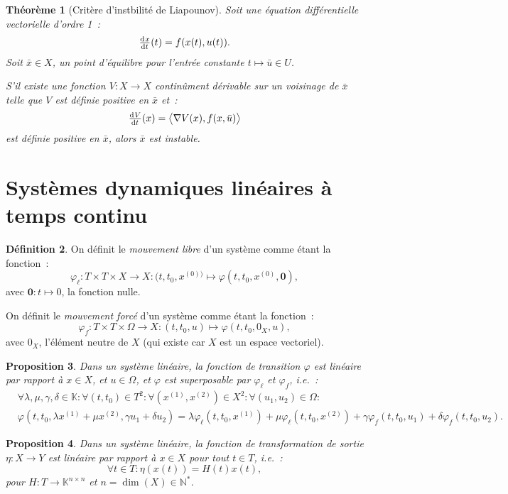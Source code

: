 \documentclass{article}
\newtheorem{thm}{Théorème}[section]
\newtheorem{prp}[thm]{Proposition}
\theoremstyle{definition}
\newtheorem{déf}[thm]{Définition}
\theoremstyle{remark}
\newcommand{\N}{\mathbb N}
\newcommand{\K}{\mathbb K}
\newcommand{\scpr}[2]{{\left\langle#1, #2\right\rangle}}
\begin{document}
	\newpage

	\begin{thm}[Critère d'instbilité de Liapounov] Soit une équation différentielle vectorielle d'ordre 1~:
	\[\od xt(t) = f(x(t), u(t)).\]
	Soit $\bar x \in X$, un point d'équilibre pour l'entrée constante $t \mapsto \bar u \in U$.

	S'il existe une fonction $V : X \to X$ continûment dérivable sur un voisinage de $\bar x$ telle que $V$ est définie positive en $\bar x$ et~:
	\[\od Vt(x) = \scpr {\nabla V(x)}{f(x, \bar u)}\]
	est définie positive en $\bar x$, alors $\bar x$ est instable.
	\end{thm}

\section{Systèmes dynamiques linéaires à temps continu}

	\begin{déf} On définit le \textit{mouvement libre} d'un système comme étant la fonction~:
	\[\varphi_\ell : T \times T \times X \to X : (t, t_0, x^{(0))} \mapsto \varphi(t, t_0, x^{(0)}, \mathbf{0}),\]
	avec $\mathbf{0} : t \mapsto 0$, la fonction nulle.

	On définit le \textit{mouvement forcé} d'un système comme étant la fonction~:
	\[\varphi_f : T \times T \times \Omega \to X : (t, t_0, u) \mapsto \varphi(t, t_0, 0_X, u),\]
	avec $0_X$, l'élément neutre de $X$ (qui existe car $X$ est un espace vectoriel).
	\end{déf}

	\begin{prp} Dans un système linéaire, la fonction de transition $\varphi$ est linéaire par rapport à $x \in X$, et $u \in \Omega$, et $\varphi$
	est superposable par $\varphi_\ell$ et $\varphi_f$, i.e.~:
	\begin{align*}
		&\forall \lambda, \mu, \gamma, \delta \in \K : \forall (t, t_0) \in T^2 : \forall (x^{(1)}, x^{(2)}) \in X^2 : \forall (u_1, u_2) \in \Omega : \\
		&\varphi\left(t, t_0, \lambda x^{(1)} + \mu x^{(2)}, \gamma u_1 + \delta u_2\right) =
			\lambda \varphi_\ell(t, t_0, x^{(1)}) + \mu \varphi_\ell(t, t_0, x^{(2)}) + \gamma \varphi_f(t, t_0, u_1) + \delta \varphi_f(t, t_0, u_2).
	\end{align*}
	\end{prp}

	\begin{prp} Dans un système linéaire, la fonction de transformation de sortie $\eta : X \to Y$ est linéaire par rapport à $x \in X$ pour tout $t \in T$, i.e.~:
	\[\forall t \in T : \eta(x(t)) = H(t)x(t),\]
	pour $H : T \to \K^{n \times n}$ et $n = \dim(X) \in \N^*$.
	\end{prp}
\end{document}
